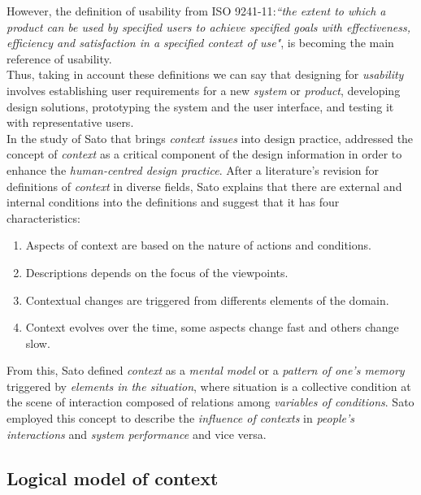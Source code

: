 However, the definition of usability from ISO
9241-11\cite{international1998iso}:\textit{``the extent to which a
product can be used by specified users to achieve specified  goals
with effectiveness, efficiency and satisfaction in a  specified
context of use"}, is becoming the main reference of usability. \\
Thus, taking in account these definitions we can say that designing for 
\textit{usability} involves establishing user requirements for a new
\textit{system} or \textit{product}, developing design solutions,
prototyping the system and the user interface, and testing it with
representative users.\\
In the study of Sato\cite{sato2004context} that brings \textit{context
issues} into design practice, addressed the concept of
\textit{context} as a critical component of the design information in
order to enhance the \textit{human-centred design practice}. After a
literature's revision for  definitions of \textit{context} in diverse
fields, Sato explains that there are external and internal conditions
into the definitions and suggest that it has four characteristics:
\begin{enumerate}  
\item Aspects of context are based on the nature of actions and 
conditions.
\item Descriptions depends on the focus of the viewpoints.
\item Contextual changes are triggered from differents elements 
of the domain. 
\item Context evolves over the time, some aspects change fast
and others change slow. 
\end{enumerate} 
From this, Sato defined \textit{context} as a \textit{mental model} or a
\textit{pattern of one's memory} triggered by \textit{elements in the
situation}, where situation is a collective condition at the scene of
interaction composed of relations among \textit{variables of
conditions}. Sato employed this concept to describe the
\textit{influence of contexts} in \textit{people's interactions} and
\textit{system performance} and vice versa.

\subsection{Logical model of context} 

